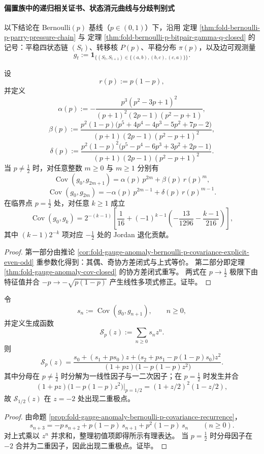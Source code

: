 \paragraph{偏置族中的递归相关证书、状态消元曲线与分歧判别式}
以下结论在 Bernoulli\((p)\) 基线（\(p\in(0,1)\)）下，沿用
定理 \ref{thm:fold-bernoulli-p-parry-pressure-chain} 与
定理 \ref{thm:fold-bernoulli-p-bitpair-gamma-q-closed}
的记号：平稳四状态链 \((S_t)\)、转移核 \(P(p)\)、平稳分布 \(\pi(p)\)，以及边可观测量
\[
g_t:=\mathbf 1_{\{(S_t,S_{t+1})\in\{(a,b),(b,c),(c,a)\}\}}.
\]

\begin{theorem}\label{thm:fold-bernoulli-p-full-autocovariance-jordan}
设
\[
r(p):=p(1-p),
\]
并定义
\[
\alpha(p):=
-\frac{p^{3}(p^{2}-3p+1)^{2}}{(p+1)^{2}(2p-1)(p^{2}-p+1)},
\]
\[
\beta(p):=
\frac{p^{2}(1-p)\bigl(p^{5}+4p^{4}-4p^{3}-5p^{2}+7p-2\bigr)}
{(p+1)(2p-1)(p^{2}-p+1)^{2}},
\]
\[
\delta(p):=
\frac{p^{2}(1-p)^{2}\bigl(p^{5}-p^{4}-6p^{3}+3p^{2}+2p-1\bigr)}
{(p+1)(2p-1)(p^{2}-p+1)^{2}}.
\]
当 \(p\neq \tfrac12\) 时，对任意整数 \(m\ge 0\) 与 \(m\ge 1\) 分别有
\[
\operatorname{Cov}(g_0,g_{2m+1})
=\alpha(p)\,p^{2m}+\beta(p)\,r(p)^m,
\]
\[
\operatorname{Cov}(g_0,g_{2m})
=-\alpha(p)\,p^{2m-1}+\delta(p)\,r(p)^{m-1}.
\]
在临界点 \(p=\tfrac12\) 处，对任意 \(k\ge 1\) 成立
\[
\operatorname{Cov}(g_0,g_k)
=2^{-(k-1)}
\left[
\frac1{16}
+(-1)^{k-1}\!\left(-\frac{13}{1296}-\frac{k-1}{216}\right)
\right],
\]
其中 \((k-1)2^{-k}\) 项对应 \(-\tfrac12\) 处的 Jordan 退化贡献。
\end{theorem}
\begin{proof}
第一部分由推论
\ref{cor:fold-gauge-anomaly-bernoulli-p-covariance-explicit-even-odd}
重参数化得到：其偶、奇协方差闭式与上式等价。
第二部分即定理 \ref{thm:fold-gauge-anomaly-cov-closed} 的协方差闭式重写。
两式在 \(p\to\tfrac12\) 极限下由特征值并合
\(
-p\to-\sqrt{p(1-p)}
\)
产生线性多项式修正。证毕。
\end{proof}

\begin{theorem}[自协方差生成函数的完全有理性与临界二重极点]\label{thm:fold-bernoulli-p-autocovariance-generating-rational}
令
\[
s_n:=\operatorname{Cov}(g_0,g_{n+1}),\qquad n\ge 0,
\]
并定义生成函数
\[
\mathcal S_p(z):=\sum_{n\ge 0}s_n z^n.
\]
则
\[
\mathcal S_p(z)=
\frac{s_0+(s_1+p s_0)z+\bigl(s_2+p s_1-p(1-p)s_0\bigr)z^2}
{(1+p z)\bigl(1-p(1-p)z^2\bigr)}.
\]
其中分母在 \(p\neq\tfrac12\) 时分解为一线性因子与一二次因子；在 \(p=\tfrac12\) 时发生并合
\[
(1+p z)\bigl(1-p(1-p)z^2\bigr)\Big|_{p=1/2}
=(1+z/2)^2(1-z/2),
\]
故 \(\mathcal S_{1/2}(z)\) 在 \(z=-2\) 处出现二重极点。
\end{theorem}
\begin{proof}
由命题 \ref{prop:fold-gauge-anomaly-bernoulli-p-covariance-recurrence}，
\[
s_{n+3}
=-p\,s_{n+2}+p(1-p)\,s_{n+1}+p^2(1-p)\,s_n\qquad(n\ge 0).
\]
对上式乘以 \(z^n\) 并求和，整理初值项即得所示有理表达。
当 \(p=\tfrac12\) 时分母因子在 \(-2\) 合并为二重因子，因此出现二重极点。证毕。
\end{proof}

